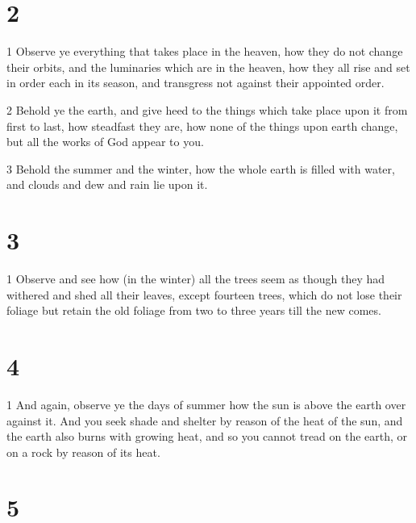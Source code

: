 \chapter{2}

\par 1 Observe ye everything that takes place in the heaven, how they do not change their orbits, and the luminaries which are in the heaven, how they all rise and set in order each in its season, and transgress not against their appointed order. 
\par 2 Behold ye the earth, and give heed to the things which take place upon it from first to last, how steadfast they are, how none of the things upon earth change, but all the works of God appear to you.
\par 3 Behold the summer and the winter, how the whole earth is filled with water, and clouds and dew and rain lie upon it.

\chapter{3}

\par 1 Observe and see how (in the winter) all the trees seem as though they had withered and shed all their leaves, except fourteen trees, which do not lose their foliage but retain the old foliage from two to three years till the new comes.

\chapter{4}

\par 1 And again, observe ye the days of summer how the sun is above the earth over against it. And you seek shade and shelter by reason of the heat of the sun, and the earth also burns with growing heat, and so you cannot tread on the earth, or on a rock by reason of its heat.

\chapter{5}

